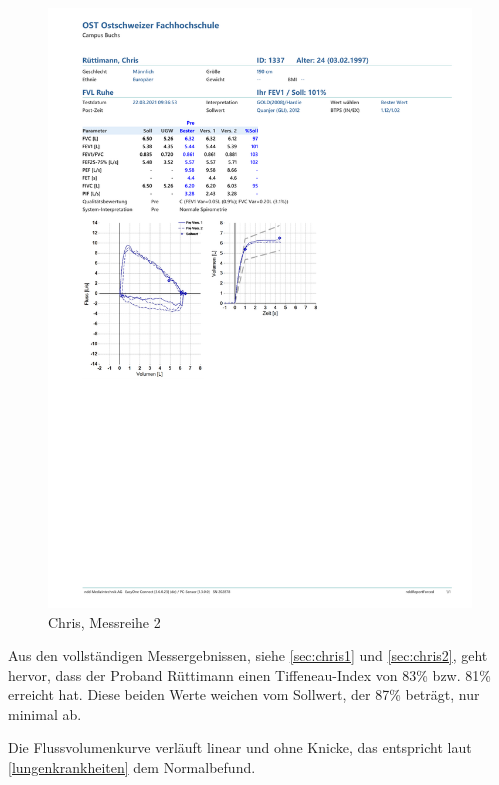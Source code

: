 \documentclass[11pt]{scrartcl}
\begin{document}
    \begin{figure}[H]
        \centering
        \includegraphics[clip, trim=1cm 10cm 0cm 11cm, width=15cm]{Dateien/Chris2.pdf}
        \caption{Chris, Messreihe 2}
    \end{figure}

    Aus den vollständigen Messergebnissen, siehe \autoref{sec:chris1} und \autoref{sec:chris2}, geht hervor, dass der
    Proband Rüttimann einen Tiffeneau-Index von 83\% bzw. 81\% erreicht hat.
    Diese beiden Werte weichen vom Sollwert, der 87\% beträgt, nur minimal ab.

    Die Flussvolumenkurve verläuft linear und ohne Knicke, das entspricht laut \autoref{lungenkrankheiten} dem
    Normalbefund.
\end{document}
